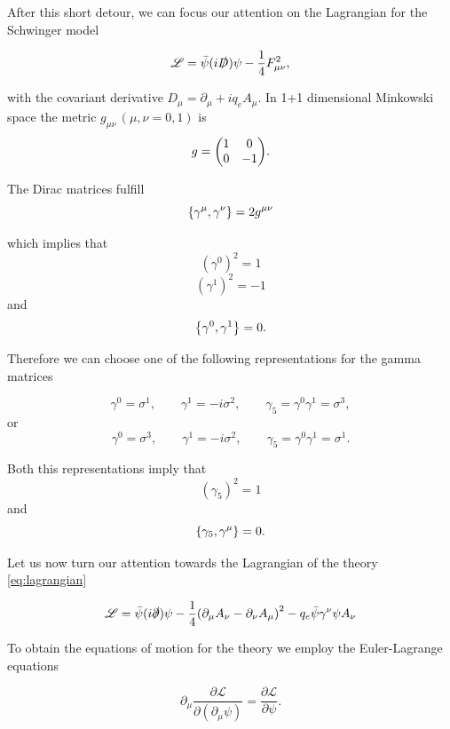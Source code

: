 After this short detour, we can focus our attention on the Lagrangian for the Schwinger model

\begin{equation}
    \mathscr{L} =  \bar\psi (i\slashed{D})\psi - \frac{1}{4} F_{\mu\nu}^2,
    \label{eq:lagrangian}
\end{equation}

with the covariant derivative $D_\mu = \partial_\mu + iq_e A_\mu$. In 1+1 dimensional Minkowski space the metric $g_{\mu\nu}\,(\mu,\nu=0,1)$ is
\begin{equation}
   g = \mqty(\dmat[0]{1,-1}).
\end{equation}

The Dirac matrices fulfill 
\begin{equation}
    \acomm{\gmu}{\gnu} = 2 g^{\mu\nu}
\end{equation}

which implies that $$(\gamma^0)^2 = 1$$ $$(\gamma^1)^2 = -1$$ and $$\acomm{\gamma^0}{\gamma^1}=0.$$

Therefore we can choose one of the following representations for the gamma matrices

\begin{equation}
    \gamma^0 = \sigma^1 ,\quad\quad \gamma^1 = -i\sigma^2,\quad\quad \gamma_5 = \gamma^0 \gamma^1 =\sigma^3 ,\label{eq:gammarep1}
\end{equation}
 or 
\begin{equation}
    \gamma^0 = \sigma^3,\quad\quad \gamma^1 = -i\sigma^2,\quad\quad \gamma_5 = \gamma^0 \gamma^1 =\sigma^1 \label{eq:gammarep2}.
\end{equation}

Both this representations  imply that $$(\gamma_5)^2 = 1$$ and $$\acomm{\gamma_5}{\gmu}=0.$$

Let us now turn our attention towards the Lagrangian of the theory \eqref{eq:lagrangian} 

\begin{equation*}
    \mathscr{L} = \bar\psi (i\slashed{\partial})\psi - \frac{1}{4} \qty(\partial_\mu A_\nu - \partial_\nu A_\mu)^2 -q_e \bar\psi\gamma^\nu\psi A_\nu
\end{equation*}

To obtain the equations of motion for the theory we employ the Euler-Lagrange equations

\begin{equation}
    \partial_\mu \frac{\partial \mathscr{L}}{\partial(\partial_\mu \psi)} = \frac{\partial\mathscr{L}}{\partial \psi}.
\end{equation}

